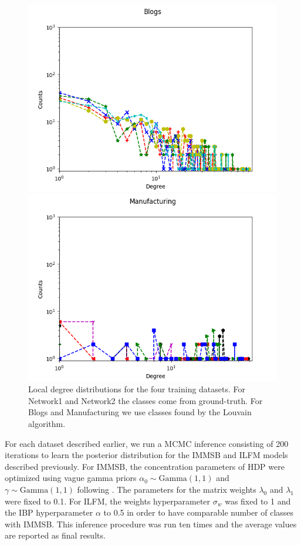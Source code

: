 \begin{figure}[h]
\begin{minipage}{0.24\textwidth}
            \includegraphics[width=\textwidth]{img/corpus/blogs_1}
        \end{minipage}
        \begin{minipage}{0.24\textwidth}
            \includegraphics[width=\textwidth]{img/corpus/manufacturing_1}
        \end{minipage}
        \caption {Local degree distributions for the four training datasets. For Network1 and Network2 the classes come from ground-truth. For Blogs and Manufacturing we use classes found by the Louvain algorithm.} 
	\label{fig:synt_graph_local}
\end{figure}

For each dataset described earlier, we run a MCMC inference consisting of 200 iterations to learn the posterior distribution for the IMMSB and ILFM  models described previously. For IMMSB, the concentration parameters of HDP were optimized  using vague gamma priors $\alpha_0 \sim \text{Gamma}(1,1)$ and $\gamma \sim \text{Gamma}(1,1)$ following \cite{HDP}. The parameters for the matrix weights  $\lambda_0$ and $\lambda_1$ were fixed to 0.1. For ILFM, the weights hyperparameter  $\sigma_w$ was fixed to 1 and the IBP hyperparameter $\alpha$ to 0.5 in order to  have comparable number of classes with IMMSB. This inference procedure was run ten times and the average values are reported as final results.

